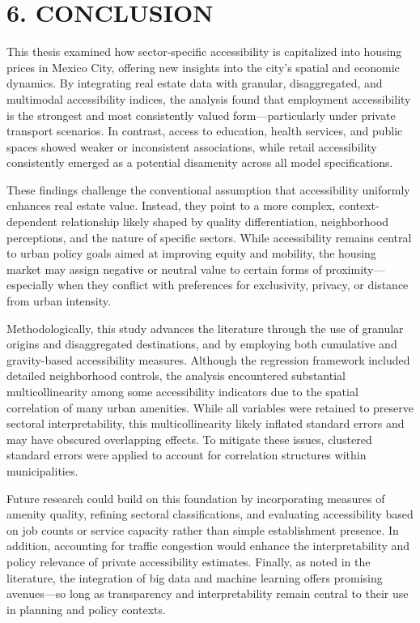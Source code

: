 \documentclass[
  12pt,
]{report}
\begin{document}
\newpage

\chapter{6. CONCLUSION}\label{conclusion}

This thesis examined how sector-specific accessibility is capitalized
into housing prices in Mexico City, offering new insights into the
city's spatial and economic dynamics. By integrating real estate data
with granular, disaggregated, and multimodal accessibility indices, the
analysis found that employment accessibility is the strongest and most
consistently valued form---particularly under private transport
scenarios. In contrast, access to education, health services, and public
spaces showed weaker or inconsistent associations, while retail
accessibility consistently emerged as a potential disamenity across all
model specifications.

These findings challenge the conventional assumption that accessibility
uniformly enhances real estate value. Instead, they point to a more
complex, context-dependent relationship likely shaped by quality
differentiation, neighborhood perceptions, and the nature of specific
sectors. While accessibility remains central to urban policy goals aimed
at improving equity and mobility, the housing market may assign negative
or neutral value to certain forms of proximity---especially when they
conflict with preferences for exclusivity, privacy, or distance from
urban intensity.

Methodologically, this study advances the literature through the use of
granular origins and disaggregated destinations, and by employing both
cumulative and gravity-based accessibility measures. Although the
regression framework included detailed neighborhood controls, the
analysis encountered substantial multicollinearity among some
accessibility indicators due to the spatial correlation of many urban
amenities. While all variables were retained to preserve sectoral
interpretability, this multicollinearity likely inflated standard errors
and may have obscured overlapping effects. To mitigate these issues,
clustered standard errors were applied to account for correlation
structures within municipalities.

Future research could build on this foundation by incorporating measures
of amenity quality, refining sectoral classifications, and evaluating
accessibility based on job counts or service capacity rather than simple
establishment presence. In addition, accounting for traffic congestion
would enhance the interpretability and policy relevance of private
accessibility estimates. Finally, as noted in the literature, the
integration of big data and machine learning offers promising
avenues---so long as transparency and interpretability remain central to
their use in planning and policy contexts.
\end{document}
